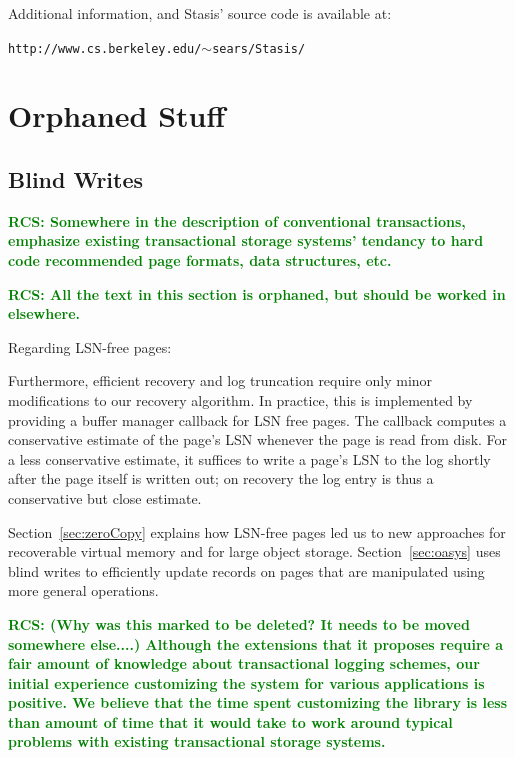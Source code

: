 \documentclass[letterpaper,twocolumn,10pt]{article}
\newcommand{\yad}{Stasis\xspace}
\newcommand{\yads}{Stasis'\xspace}
\newcommand{\rcs}[1]{\textcolor{green}{\bf RCS: #1}}
\begin{document}
Additional information, and \yads source code is available at:

\begin{center}
{\small{\tt http://www.cs.berkeley.edu/\ensuremath{\sim}sears/\yad/}}
\end{center}

{\footnotesize 
\nocite{*}
}

\theendnotes
\section{Orphaned Stuff}

\subsection{Blind Writes}
\label{sec:blindWrites}
\rcs{Somewhere in the description of conventional transactions, emphasize existing transactional storage systems' tendancy to hard code recommended page formats, data structures, etc.}

\rcs{All the text in this section is orphaned, but should be worked in elsewhere.}

Regarding LSN-free pages:

Furthermore, efficient recovery and
log truncation require only minor modifications to our recovery
algorithm.  In practice, this is implemented by providing a buffer manager callback
for LSN free pages.  The callback computes a
conservative estimate of the page's LSN whenever the page is read from disk.
For a less conservative estimate, it suffices to write a page's LSN to
the log shortly after the page itself is written out; on recovery the
log entry is thus a conservative but close estimate.

Section~\ref{sec:zeroCopy} explains how LSN-free pages led us to new 
approaches for recoverable virtual memory and for large object storage.  
Section~\ref{sec:oasys} uses blind writes to efficiently update records 
on pages that are manipulated using more general operations.  

\rcs{ (Why was this marked to be deleted?  It needs to be moved somewhere else....)
Although the extensions that it proposes
require a fair amount of knowledge about transactional logging
schemes, our initial experience customizing the system for various
applications is positive.  We believe that the time spent customizing
the library is less than amount of time that it would take to work
around typical problems with existing transactional storage systems.
}
\end{document}
